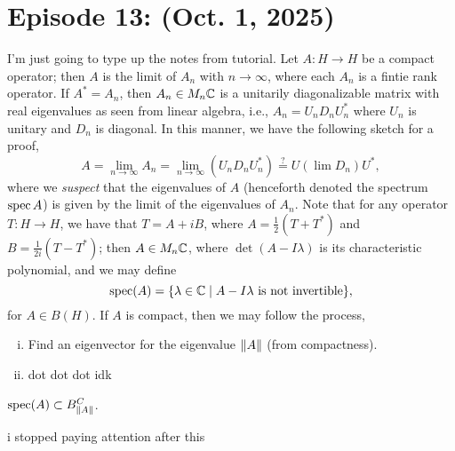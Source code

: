 \section{Episode 13: (Oct. 1, 2025)}
I'm just going to type up the notes from tutorial. Let $A : H \to H$ be a compact operator; then $A$ is the limit of $A_n$ with $n \to \infty$, where each $A_n$ is a fintie rank operator. If $A^\ast = A_n$, then $A_n \in M_n \mathbb C$ is a unitarily diagonalizable matrix with real eigenvalues as seen from linear algebra, i.e., $A_n = U_n D_n U_n^\ast$ where $U_n$ is unitary and $D_n$ is diagonal. In this manner, we have the following sketch for a proof,
\[ A = \lim_{n \to \infty} A_n = \lim_{n \to \infty} (U_n D_n U_n^\ast) \stackrel{?}{=} U(\lim D_n) U^\ast, \]
where we \textit{suspect} that the eigenvalues of $A$ (henceforth denoted the spectrum $\operatorname{spec} A$) is given by the limit of the eigenvalues of $A_n$. Note that for any operator $T : H \to H$, we have that $T = A + iB$, where $A = \frac{1}{2}(T + T^\ast)$ and $B = \frac{1}{2i}(T - T^\ast)$; then $A \in M_n\mathbb C$, where $\det(A - I\lambda)$ is its characteristic polynomial, and we may define
\[ \operatorname{spec}(A) = \{\lambda \in \mathbb C \mid A - I\lambda \text{ is not invertible}\}, \]
for $A \in B(H)$. If $A$ is compact, then we may follow the process,
\begin{enumerate}[(i)]
    \item Find an eigenvector for the eigenvalue $\left\lVert A \right\rVert$ (from compactness).
    \item dot dot dot idk
\end{enumerate}
\begin{theorem}
    $\operatorname{spec}(A) \subset B^C_{\left\lVert A \right\rVert}$.
\end{theorem}
\noindent i stopped paying attention after this
